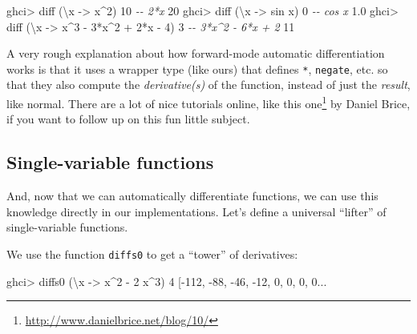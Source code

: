 \documentclass[]{article}
\newenvironment{Shaded}{}{}
\newcommand{\CommentTok}[1]{\textcolor[rgb]{0.38,0.63,0.69}{\textit{#1}}}
\newcommand{\DecValTok}[1]{\textcolor[rgb]{0.25,0.63,0.44}{#1}}
\newcommand{\FloatTok}[1]{\textcolor[rgb]{0.25,0.63,0.44}{#1}}
\newcommand{\FunctionTok}[1]{\textcolor[rgb]{0.02,0.16,0.49}{#1}}
\newcommand{\NormalTok}[1]{#1}
\newcommand{\OperatorTok}[1]{\textcolor[rgb]{0.40,0.40,0.40}{#1}}
\newcommand{\OtherTok}[1]{\textcolor[rgb]{0.00,0.44,0.13}{#1}}
\renewcommand{\href}[2]{#2\footnote{\url{#1}}}
\begin{document}
\begin{Shaded}
\begin{Highlighting}[]
\NormalTok{ghci}\OperatorTok{\textgreater{}}\NormalTok{ diff (\textbackslash{}x }\OtherTok{{-}\textgreater{}}\NormalTok{ x}\OperatorTok{\^{}}\DecValTok{2}\NormalTok{) }\DecValTok{10}       \CommentTok{{-}{-} 2*x}
\DecValTok{20}
\NormalTok{ghci}\OperatorTok{\textgreater{}}\NormalTok{ diff (\textbackslash{}x }\OtherTok{{-}\textgreater{}} \FunctionTok{sin}\NormalTok{ x) }\DecValTok{0}      \CommentTok{{-}{-} cos x}
\FloatTok{1.0}
\NormalTok{ghci}\OperatorTok{\textgreater{}}\NormalTok{ diff (\textbackslash{}x }\OtherTok{{-}\textgreater{}}\NormalTok{ x}\OperatorTok{\^{}}\DecValTok{3} \OperatorTok{{-}} \DecValTok{3}\OperatorTok{*}\NormalTok{x}\OperatorTok{\^{}}\DecValTok{2} \OperatorTok{+} \DecValTok{2}\OperatorTok{*}\NormalTok{x }\OperatorTok{{-}} \DecValTok{4}\NormalTok{) }\DecValTok{3}  \CommentTok{{-}{-} 3*x\^{}2 {-} 6*x + 2}
\DecValTok{11}
\end{Highlighting}
\end{Shaded}

A very rough explanation about how forward-mode automatic differentiation works
is that it uses a wrapper type (like ours) that defines \texttt{*},
\texttt{negate}, etc. so that they also compute the \emph{derivative(s)} of the
function, instead of just the \emph{result}, like normal. There are a lot of
nice tutorials online, like \href{http://www.danielbrice.net/blog/10/}{this one}
by Daniel Brice, if you want to follow up on this fun little subject.

\subsection{Single-variable functions}\label{single-variable-functions}

And, now that we can automatically differentiate functions, we can use this
knowledge directly in our implementations. Let's define a universal ``lifter''
of single-variable functions.

We use the function \texttt{diffs0} to get a ``tower'' of derivatives:

\begin{Shaded}
\begin{Highlighting}[]
\NormalTok{ghci}\OperatorTok{\textgreater{}}\NormalTok{ diffs0 (\textbackslash{}x }\OtherTok{{-}\textgreater{}}\NormalTok{ x}\OperatorTok{\^{}}\DecValTok{2} \OperatorTok{{-}} \DecValTok{2}\NormalTok{ x}\OperatorTok{\^{}}\DecValTok{3}\NormalTok{) }\DecValTok{4}
\NormalTok{[}\OperatorTok{{-}}\DecValTok{112}\NormalTok{, }\OperatorTok{{-}}\DecValTok{88}\NormalTok{, }\OperatorTok{{-}}\DecValTok{46}\NormalTok{, }\OperatorTok{{-}}\DecValTok{12}\NormalTok{, }\DecValTok{0}\NormalTok{, }\DecValTok{0}\NormalTok{, }\DecValTok{0}\NormalTok{, }\DecValTok{0}\OperatorTok{...}
\end{Highlighting}
\end{Shaded}
\end{document}
